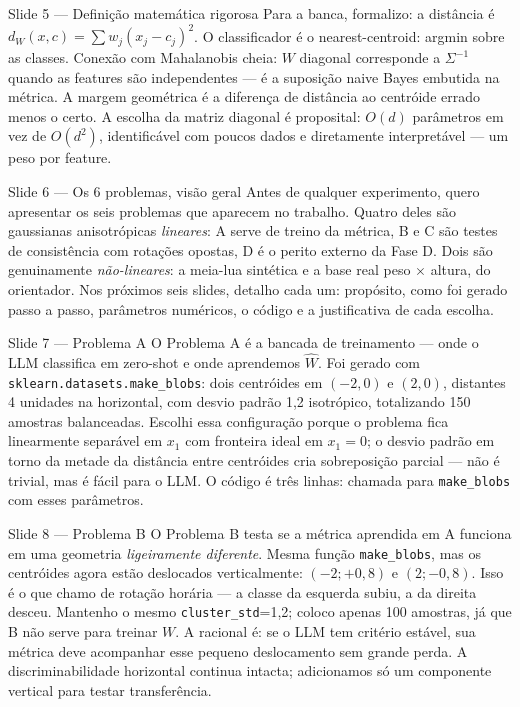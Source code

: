 \documentclass[aspectratio=169,10pt]{beamer}
\begin{document}
\begin{frame}{Slide 5 --- Defini\c{c}\~ao matem\'atica rigorosa}
\footnotesize
Para a banca, formalizo: a dist\^ancia \'e $d_W(x,c) = \sum w_j (x_j - c_j)^2$. O classificador \'e o nearest-centroid: argmin sobre as classes. Conex\~ao com Mahalanobis cheia: $W$ diagonal corresponde a $\Sigma^{-1}$ quando as features s\~ao independentes --- \'e a suposi\c{c}\~ao naive Bayes embutida na m\'etrica. A margem geom\'etrica \'e a diferen\c{c}a de dist\^ancia ao centr\'oide errado menos o certo. A escolha da matriz diagonal \'e proposital: $O(d)$ par\^ametros em vez de $O(d^2)$, identific\'avel com poucos dados e diretamente interpret\'avel --- um peso por feature.
\end{frame}

\begin{frame}{Slide 6 --- Os 6 problemas, vis\~ao geral}
\footnotesize
Antes de qualquer experimento, quero apresentar os seis problemas que aparecem no trabalho. Quatro deles s\~ao gaussianas anisotr\'opicas \emph{lineares}: A serve de treino da m\'etrica, B e C s\~ao testes de consist\^encia com rota\c{c}\~oes opostas, D \'e o perito externo da Fase D. Dois s\~ao genuinamente \emph{n\~ao-lineares}: a meia-lua sint\'etica e a base real peso $\times$ altura, do orientador. Nos pr\'oximos seis slides, detalho cada um: prop\'osito, como foi gerado passo a passo, par\^ametros num\'ericos, o c\'odigo e a justificativa de cada escolha.
\end{frame}

\begin{frame}{Slide 7 --- Problema A}
\footnotesize
O Problema A \'e a bancada de treinamento --- onde o LLM classifica em zero-shot e onde aprendemos $\hat W$. Foi gerado com \texttt{sklearn.datasets.make\_blobs}: dois centr\'oides em $(-2, 0)$ e $(2, 0)$, distantes 4 unidades na horizontal, com desvio padr\~ao 1{,}2 isotr\'opico, totalizando 150 amostras balanceadas. Escolhi essa configura\c{c}\~ao porque o problema fica linearmente separ\'avel em $x_1$ com fronteira ideal em $x_1=0$; o desvio padr\~ao em torno da metade da dist\^ancia entre centr\'oides cria sobreposi\c{c}\~ao parcial --- n\~ao \'e trivial, mas \'e f\'acil para o LLM. O c\'odigo \'e tr\^es linhas: chamada para \texttt{make\_blobs} com esses par\^ametros.
\end{frame}

\begin{frame}{Slide 8 --- Problema B}
\footnotesize
O Problema B testa se a m\'etrica aprendida em A funciona em uma geometria \emph{ligeiramente diferente}. Mesma fun\c{c}\~ao \texttt{make\_blobs}, mas os centr\'oides agora est\~ao deslocados verticalmente: $(-2; +0{,}8)$ e $(2; -0{,}8)$. Isso \'e o que chamo de rota\c{c}\~ao hor\'aria --- a classe da esquerda subiu, a da direita desceu. Mantenho o mesmo \texttt{cluster\_std}=1{,}2; coloco apenas 100 amostras, j\'a que B n\~ao serve para treinar $W$. A racional \'e: se o LLM tem crit\'erio est\'avel, sua m\'etrica deve acompanhar esse pequeno deslocamento sem grande perda. A discriminabilidade horizontal continua intacta; adicionamos s\'o um componente vertical para testar transfer\^encia.
\end{frame}
\end{document}
